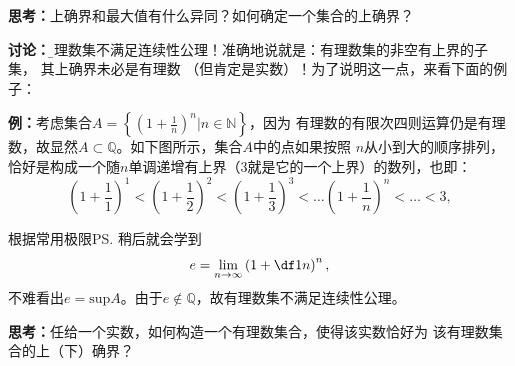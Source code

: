 	{\bf 思考：}上确界和最大值有什么异同？如何确定一个集合的上确界？
	
	{\bf 讨论：}{\b 有理数集不满足连续性公理！}准确地说就是：有理数集的非空有上界的子集，
	其上确界未必是有理数	（但肯定是实数）！为了说明这一点，来看下面的例子：
	
	{\bf 例：}考虑集合$A=\left\{\left(1+\frac 1n\right)^n|n\in\mathbb{N}\right\}$，因为
	有理数的有限次四则运算仍是有理数，故显然$A\subset\mathbb{Q}$。如下图所示，集合$A$中的点如果按照
	$n$从小到大的顺序排列，恰好是构成一个随$n$单调递增有上界（$3$就是它的一个上界）的数列，也即：
	$$\left(1+\frac11\right)^1<\left(1+\frac12\right)^2<\left(1+\frac13\right)^3<\ldots
	\left(1+\frac1n\right)^n<\ldots<3,$$
	\begin{center}
	\end{center}
	根据常用极限\ps{稍后就会学到}
	$$e=\lim\limits_{n\to\infty}\left(1+\df1n\right)^n,$$
	不难看出$e=\mathrm{sup}A$。由于$e\notin\mathbb{Q}$，故有理数集不满足连续性公理。
	
	{\bf 思考：}任给一个实数，如何构造一个有理数集合，使得该实数恰好为
	该有理数集合的上（下）确界？
	
